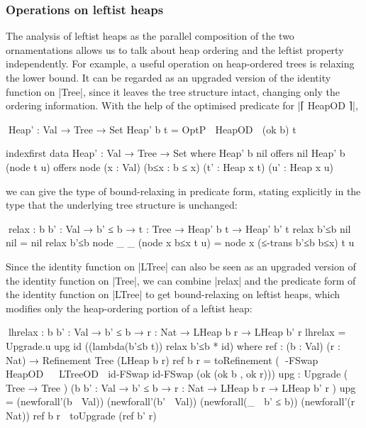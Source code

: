 \subsubsection{Operations on leftist heaps}

The analysis of leftist heaps as the parallel composition of the two ornamentations allows us to talk about heap ordering and the leftist property independently.
For example, a useful operation on heap-ordered trees is relaxing the lower bound.
It can be regarded as an upgraded version of the identity function on |Tree|, since it leaves the tree structure intact, changing only the ordering information.
With the help of the optimised predicate for |⌈ HeapOD ⌉|,
\begin{code}
^^^Heap' : Val → Tree → Set
Heap' b t = OptP ⌈ HeapOD ⌉ (ok b) t

indexfirst data Heap' : Val → Tree → Set where
  Heap' b  nil         offers  nil
  Heap' b  (node t u)  offers  node  (x : Val) (b≤x : b ≤ x)
                                     (t' : Heap x t) (u' : Heap x u)
\end{code}
we can give the type of bound-relaxing in predicate form, stating explicitly in the type that the underlying tree structure is unchanged:
\begin{code}
^^^relax : {b b' : Val} → b' ≤ b → {t : Tree} → Heap' b t → Heap' b' t
relax b'≤b {nil       }  nil               =  nil
relax b'≤b {node _ _  }  (node x b≤x t u)  =  node x (≤-trans b'≤b b≤x) t u
\end{code}
Since the identity function on |LTree| can also be seen as an upgraded version of the identity function on |Tree|, we can combine |relax| and the predicate form of the identity function on |LTree| to get bound-relaxing on leftist heaps, which modifies only the heap-ordering portion of a leftist heap:
\begin{code}
^^^lhrelax : {b b' : Val} → b' ≤ b → {r : Nat} → LHeap b r → LHeap b' r
lhrelax = Upgrade.u upg id ((lambda(b'≤b t)) relax b'≤b * id)
  where
    ref : (b : Val) (r : Nat) → Refinement Tree (LHeap b r)
    ref b r =  toRefinement
                 (  ⊗-FSwap ⌈ HeapOD ⌉ ⌈ LTreeOD ⌉ id-FSwap id-FSwap
                      (ok (ok b , ok r)))
    upg :  Upgrade
             (                                     Tree       → Tree        )
             ({b b' : Val} → b' ≤ b → {r : Nat} →  LHeap b r  → LHeap b' r  )
    upg =   (newforall'(b ∶ Val)) (newforall'(b' ∶ Val)) (newforall(_ ∶ b' ≤ b))
              (newforall'(r ∶ Nat)) ref b r ⇀ toUpgrade (ref b' r)
\end{code}
